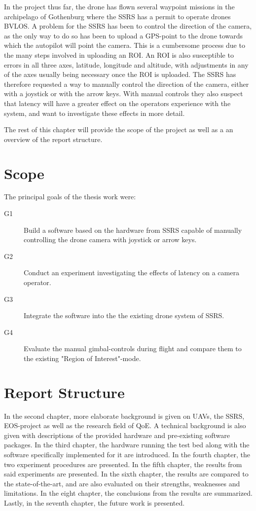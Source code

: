 \documentclass[nofilelist]{cslthse-msc}
\begin{document}
In the project thus far, the drone has flown several waypoint missions in the archipelago of Gothenburg where the SSRS has a permit to operate drones BVLOS. A problem for the SSRS has been to control the direction of the camera, as the only way to do so has been to upload a GPS-point to the drone towards which the autopilot will point the camera. This is a cumbersome process due to the many steps involved in uploading an ROI. An ROI is also susceptible to errors in all three axes, latitude, longitude and altitude, with adjustments in any of the axes usually being necessary once the ROI is uploaded. The SSRS has therefore requested a way to manually control the direction of the camera, either with a joystick or with the arrow keys. With manual controls they also suspect that latency will have a greater effect on the operators experience with the system, and want to investigate these effects in more detail.

The rest of this chapter will provide the scope of the project as well as a an overview of the report structure.

\section{Scope}
\label{sec:scope}
The principal goals of the thesis work were:
\begin{description}
   \item[G1] Build a software based on the hardware from SSRS capable of manually controlling the drone camera with joystick or arrow keys. 
   \item[G2] Conduct an experiment investigating the effects of latency on a camera operator. 
   \item[G3] Integrate the software into the the existing drone system of SSRS.
   \item[G4] Evaluate the manual gimbal-controls during flight and compare them to the existing "Region of Interest"-mode.
\end{description}

\section{Report Structure}
In the second chapter, more elaborate background is given on UAVs, the SSRS, EOS-project as well as the research field of QoE. A technical background is also given with descriptions of the provided hardware and pre-existing software packages. In the third chapter, the hardware running the test bed along with the software specifically implemented for it are introduced. In the fourth chapter, the two experiment procedures are presented. In the fifth chapter, the results from said experiments are presented. In the sixth chapter, the results are compared to the state-of-the-art, and are also evaluated on their strengths, weaknesses and limitations. In the eight chapter, the conclusions from the results are summarized. Lastly, in the seventh chapter, the future work is presented.
\end{document}
